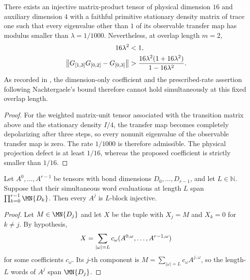 \begin{lemma}
    \label{thm:fnw-dimension-only-counterexample}
    \leanok
    There exists an injective matrix-product tensor of physical dimension
    $16$ and auxiliary dimension $4$ with a faithful primitive stationary
    density matrix of trace one such that every eigenvalue other than $1$
    of its observable transfer map has modulus smaller than
    $\lambda=1/1000$. Nevertheless, at overlap length $m=2$,
    \begin{align}
        16\lambda^2 & <1,\notag                                                \\
        \left\|G_{[1,3]}G_{[0,2]}-G_{[0,3]}\right\|
                    & >\frac{16\lambda^2(1+16\lambda^2)}{1-16\lambda^2}.\notag
    \end{align}
    As recorded in \cite{gap:cpgsv21_martingale_overlap}, the dimension-only
    coefficient and the prescribed-rate assertion following Nachtergaele's
    bound therefore cannot hold simultaneously at this fixed overlap length.
\end{lemma}
\begin{proof}\leanok
    For the weighted matrix-unit tensor associated with the transition
    matrix above and the stationary density $I/4$, the transfer map becomes
    completely depolarizing after three steps, so every nonunit eigenvalue
    of the observable transfer map is zero. The rate $1/1000$ is therefore
    admissible. The physical projection defect is at least $1/16$, whereas
    the proposed coefficient is strictly smaller than $1/16$.
\end{proof}

\begin{lemma}
    \label{thm:block_injective_of_word_tuple_span}
    \leanok
    Let $A^0,\ldots,A^{r-1}$ be tensors with bond dimensions
    $D_0,\ldots,D_{r-1}$, and let $L\in\mathbb N$. Suppose that their
    simultaneous word evaluations at length $L$ span
    $\prod_{k=0}^{r-1}\MN{D_k}$. Then every $A^j$ is $L$-block injective.
\end{lemma}
\begin{proof}
    \leanok
    Let $M\in\MN{D_j}$ and let $X$ be the tuple with $X_j=M$ and $X_k=0$ for
    $k\neq j$. By hypothesis,
    \begin{align}
        X=\sum_{|\omega|=L}c_\omega(A^{0,\omega},\ldots,A^{r-1,\omega})\notag
    \end{align}
    for some coefficients $c_\omega$. Its $j$-th component is
    $M=\sum_{|\omega|=L}c_\omega A^{j,\omega}$, so the length-$L$ words of
    $A^j$ span $\MN{D_j}$.
\end{proof}

